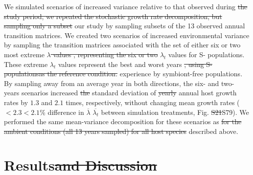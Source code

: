 \documentclass[lineno,sn-nature]{sn-jnl}%
\providecommand{\DIFadd}[1]{{\protect\color{blue}#1}} %
\providecommand{\DIFdel}[1]{{\protect\color{red}\protect\scriptsize\sout{#1}}}
\providecommand{\DIFadd}[1]{{\protect\color{blue}\uwave{#1}}} %
\providecommand{\DIFdel}[1]{{\protect\color{red}\sout{#1}}}                      %
\providecommand{\DIFaddbegin}{} %
\providecommand{\DIFaddend}{} %
\providecommand{\DIFdelbegin}{} %
\providecommand{\DIFdelend}{} %
\newcommand{\DIFscaledelfig}{0.5}
\newlength{\DIFdelgraphicswidth} %
\newlength{\DIFdelgraphicsheight} %
\newcommand{\DIFaddincludegraphics}[2][]{{\color{blue}\fbox{\DIFOincludegraphics[#1]{#2}}}} %
\newcommand{\DIFdelincludegraphics}[2][]{%
\sbox{\DIFdelgraphicsbox}{\DIFOincludegraphics[#1]{#2}}%
\settoboxwidth{\DIFdelgraphicswidth}{\DIFdelgraphicsbox} %
\settoboxtotalheight{\DIFdelgraphicsheight}{\DIFdelgraphicsbox} %
\scalebox{\DIFscaledelfig}{%
\parbox[b]{\DIFdelgraphicswidth}{\usebox{\DIFdelgraphicsbox}\\[-\baselineskip] \rule{\DIFdelgraphicswidth}{0em}}\llap{\resizebox{\DIFdelgraphicswidth}{\DIFdelgraphicsheight}{%
\setlength{\unitlength}{\DIFdelgraphicswidth}%
\begin{picture}(1,1)%
\thicklines\linethickness{2pt} %
{\color[rgb]{1,0,0}\put(0,0){\framebox(1,1){}}}%
{\color[rgb]{1,0,0}\put(0,0){\line( 1,1){1}}}%
{\color[rgb]{1,0,0}\put(0,1){\line(1,-1){1}}}%
\end{picture}%
}\hspace*{3pt}}} %
} %
\DeclareRobustCommand{\DIFaddbegin}{\DIFOaddbegin \let\includegraphics\DIFaddincludegraphics} %
\DeclareRobustCommand{\DIFaddend}{\DIFOaddend \let\includegraphics\DIFOincludegraphics} %
\DeclareRobustCommand{\DIFdelbegin}{\DIFOdelbegin \let\includegraphics\DIFdelincludegraphics} %
\DeclareRobustCommand{\DIFdelend}{\DIFOaddend \let\includegraphics\DIFOincludegraphics} %
\begin{document}
	\DIFadd{We simulated }\DIFaddend scenarios of increased variance relative to that observed during \DIFdelbegin \DIFdel{the study period, we repeated the stochastic growth rate decomposition, but sampling only a subset }\DIFdelend \DIFaddbegin \DIFadd{our study by sampling subsets }\DIFaddend of the 13 observed annual transition matrices. 
	We created two scenarios of increased environmental variance by sampling the transition matrices associated with the \DIFaddbegin \DIFadd{set of either }\DIFaddend six or two most extreme \DIFdelbegin \DIFdel{$\lambda$ values , representing the six or two }\DIFdelend \DIFaddbegin \DIFadd{$\lambda_{t}$ values for S- populations. 
	These extreme $\lambda_{t}$ values represent the }\DIFaddend best and worst years \DIFdelbegin \DIFdel{, using S- populationsas the reference condition. 
	}\DIFdelend \DIFaddbegin \DIFadd{experience by symbiont-free populations. 
	}\DIFaddend By sampling away from an average year in both directions, the six- and two- years scenarios increased \DIFdelbegin \DIFdel{the }\DIFdelend standard deviation of \DIFdelbegin \DIFdel{yearly }\DIFdelend \DIFaddbegin \DIFadd{annual }\DIFaddend host growth rates by $1.3$ and $2.1$ times, respectively, without changing mean growth rates (\DIFdelbegin \DIFdel{$<2.3$}\DIFdelend \DIFaddbegin \DIFadd{$<2.1$}\DIFaddend \% difference in \DIFdelbegin \DIFdel{$\overline{\lambda}$ }\DIFdelend \DIFaddbegin \DIFadd{$\overline{\lambda_{t}}$ }\DIFaddend between simulation treatments, Fig. \DIFdelbegin \DIFdel{S21}\DIFdelend \DIFaddbegin \DIFadd{S79}\DIFaddend ).
	We performed the same mean-variance decomposition for these scenarios as \DIFdelbegin \DIFdel{for the ambient conditions (all 13 years sampled) for all host species }\DIFdelend described above. 

\section*{Results\DIFdelbegin \DIFdel{and Discussion}\DIFdelend }
\end{document}
